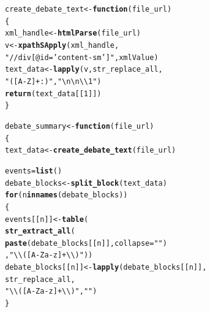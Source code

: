 \documentclass{article}\usepackage[]{graphicx}\usepackage[]{color}
\makeatletter
\newcommand{\hlnum}[1]{\textcolor[rgb]{0.686,0.059,0.569}{#1}}%
\newcommand{\hlstr}[1]{\textcolor[rgb]{0.192,0.494,0.8}{#1}}%
\newcommand{\hlstd}[1]{\textcolor[rgb]{0.345,0.345,0.345}{#1}}%
\newcommand{\hlkwa}[1]{\textcolor[rgb]{0.161,0.373,0.58}{\textbf{#1}}}%
\newcommand{\hlkwb}[1]{\textcolor[rgb]{0.69,0.353,0.396}{#1}}%
\newcommand{\hlkwc}[1]{\textcolor[rgb]{0.333,0.667,0.333}{#1}}%
\newcommand{\hlkwd}[1]{\textcolor[rgb]{0.737,0.353,0.396}{\textbf{#1}}}%
\newenvironment{kframe}{%
 \def\at@end@of@kframe{}%
 \ifinner\ifhmode%
  \def\at@end@of@kframe{\end{minipage}}%
  \begin{minipage}{\columnwidth}%
 \fi\fi%
 \def\FrameCommand##1{\hskip\@totalleftmargin \hskip-\fboxsep
 \colorbox{shadecolor}{##1}\hskip-\fboxsep
     \hskip-\linewidth \hskip-\@totalleftmargin \hskip\columnwidth}%
 \MakeFramed {\advance\hsize-\width
   \@totalleftmargin\z@ \linewidth\hsize
   \@setminipage}}%
 {\par\unskip\endMakeFramed%
 \at@end@of@kframe}
\newenvironment{knitrout}{}{} %
\makeatother
\begin{document}
\begin{knitrout}
\begin{kframe}
\begin{alltt}
\hlstd{create_debate_text} \hlkwb{<-} \hlkwa{function}\hlstd{(}\hlkwc{file_url}\hlstd{)}
\hlstd{\{}
  \hlstd{xml_handle} \hlkwb{<-} \hlkwd{htmlParse}\hlstd{(file_url)}
  \hlstd{v} \hlkwb{<-} \hlkwd{xpathSApply}\hlstd{(xml_handle,}
                   \hlstr{"//div[@id = 'content-sm']"}\hlstd{,xmlValue)}
  \hlstd{text_data} \hlkwb{<-} \hlkwd{lapply}\hlstd{(v,str_replace_all,}
                      \hlstr{"([A-Z]+:)"}\hlstd{,}\hlstr{"\textbackslash{}n\textbackslash{}n\textbackslash{}\textbackslash{}1"}\hlstd{)}
  \hlkwd{return}\hlstd{(text_data[[}\hlnum{1}\hlstd{]])}
\hlstd{\}}

\hlstd{debate_summary} \hlkwb{<-} \hlkwa{function}\hlstd{(}\hlkwc{file_url}\hlstd{)}
\hlstd{\{}
\hlstd{text_data} \hlkwb{<-} \hlkwd{create_debate_text}\hlstd{(file_url)}

\hlstd{events} \hlkwb{=} \hlkwd{list}\hlstd{()}
\hlstd{debate_blocks} \hlkwb{<-} \hlkwd{split_block}\hlstd{(text_data)}
\hlkwa{for} \hlstd{(n} \hlkwa{in} \hlkwd{names}\hlstd{(debate_blocks))}
\hlstd{\{}
   \hlstd{events[[n]]} \hlkwb{<-} \hlkwd{table}\hlstd{(}
     \hlkwd{str_extract_all}\hlstd{(}
       \hlkwd{paste}\hlstd{(debate_blocks[[n]],}\hlkwc{collapse}\hlstd{=}\hlstr{" "}\hlstd{)}
       \hlstd{,}\hlstr{"\textbackslash{}\textbackslash{}([A-Za-z]+\textbackslash{}\textbackslash{})"}\hlstd{))}
   \hlstd{debate_blocks[[n]]} \hlkwb{<-} \hlkwd{lapply}\hlstd{(debate_blocks[[n]],}
                                \hlstd{str_replace_all,}
                                \hlstr{"\textbackslash{}\textbackslash{}([A-Za-z]+\textbackslash{}\textbackslash{})"}\hlstd{,}\hlstr{""}\hlstd{)}
\hlstd{\}}


\end{alltt}
\end{kframe}
\end{knitrout}
\end{document}
